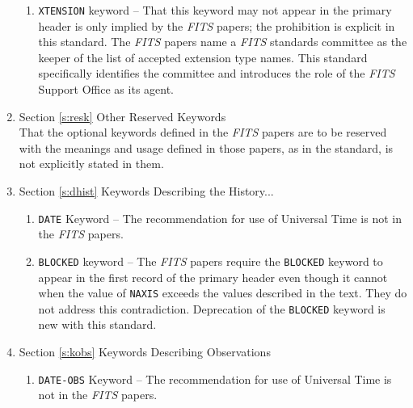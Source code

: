 \begin{enumerate}
\begin{enumerate}
 \item {\tt XTENSION} keyword -- That this keyword 
     may not appear in the primary header is only implied by 
     the {\em FITS\/} papers; the prohibition is explicit in this standard.
     The {\em FITS\/} papers name a {\em FITS\/} standards committee 
     as the keeper of the list of accepted extension 
     type names. This standard specifically identifies the committee 
     and introduces the role of the {\em FITS\/} Support 
     Office
     as its agent.

 \end{enumerate}

\item Section \ref{s:resk} Other Reserved Keywords\\
     That the optional keywords defined 
     in the {\em FITS\/} papers are 
     to be reserved with the meanings and usage defined in those papers, 
     as in the standard, is not explicitly stated in them.

\item Section \ref{s:dhist} Keywords Describing the History...

 \begin{enumerate}

 \item {\tt DATE} Keyword -- The recommendation 
       for use of Universal Time is not 
       in the {\em FITS\/} papers.

 \item {\tt BLOCKED} keyword -- The {\em FITS\/} papers
     require the {\tt BLOCKED} keyword to appear 
     in the first record of the primary header 
     even though it cannot when the value of {\tt NAXIS}
     exceeds the values described in the text.  They do
     not address this contradiction.  Deprecation of the {\tt BLOCKED}
     keyword is new with this standard. 

 \end{enumerate}

\item Section \ref{s:kobs} Keywords Describing Observations

 \begin{enumerate}

 \item {\tt DATE-OBS} Keyword -- The 
     recommendation for use of
     Universal Time
     is not in the {\em FITS\/} papers.


\end{enumerate}
\end{enumerate}
